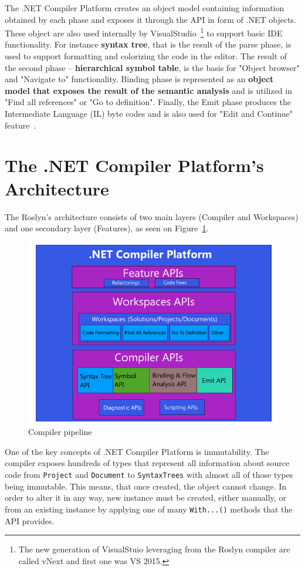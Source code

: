 \documentclass[
  digital, %
  table,   %
  lof,     %
  lot,     %
  oneside,
]{fithesis3}
\begin{document}
The .NET Compiler Platform creates an object model containing information obtained by each phase and exposes it through the API in form of .NET objects. These object are also used internally by VisualStudio~\footnote{The new generation of VisualStuio leveraging from the Roslyn compiler are called vNext and first one was VS 2015.} to support basic IDE functionality. For instance \textbf{syntax tree}, that is the result of the parse phase, is used to support formatting and colorizing the code in the editor. The result of the second phase -- \textbf{hierarchical symbol table}, is the basis for "Object browser" and "Navigate to" functionality. Binding phase is represented as an \textbf{object model that exposes the result of the semantic analysis} and is utilized in "Find all references" or "Go to definition". Finally, the Emit phase produces the Intermediate Language (IL) byte codes and is also used for "Edit and Continue" feature~\cite{roslyn-overview}.

  \section{The .NET Compiler Platform's Architecture}
The Roslyn's architecture consists of two main layers (Compiler and Workspaces) and one secondary layer (Features), as seen on Figure~\ref{fig:roslyn-compiler-architecture}.

\begin{figure}[h!]
		\centering
			\includegraphics[scale=0.6]{img/roslyn-compiler-architecture}
		\caption{Compiler pipeline~\cite{roslyn-succincly}}
		\label{fig:roslyn-compiler-architecture}
\end{figure}

One of the key concepts of .NET Compiler Platform is immutability. The compiler exposes hundreds of types that represent all information about source code from \texttt{Project} and \texttt{Document} to \texttt{SyntaxTrees} with almost all of those types being immutable. This means, that once created, the object cannot change. In order to alter it in any way, new instance must be created, either manually, or from an existing instance by applying one of many \texttt{With...()} methods that the API provides.
\end{document}
